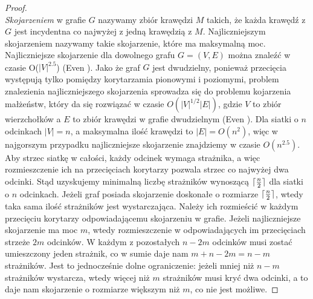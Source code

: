 \documentclass[brudnopis]{xmgr}
\DeclarePairedDelimiter\ceil{\lceil}{\rceil}
\theoremstyle{definition}
\begin{document}
\begin{proof}
 \\ \emph{Skojarzeniem} w grafie $G$ nazywamy zbiór krawędzi $M$ takich, że każda krawędź z $G$ jest incydentna co najwyżej z jedną krawędzią z $M$. Najliczniejszym skojarzeniem nazywamy takie skojarzenie, które ma maksymalną moc. Najliczniejsze skojarzenie dla dowolnego grafu $G = (V,E)$ można znaleźć w czasie O($|V|^{2.5}$) (Even \cite{even}). Jako że graf $G$ jest dwudzielny, ponieważ przecięcia występują tylko pomiędzy korytarzamia pionowymi i poziomymi, problem znalezienia najliczniejszego skojarzenia sprowadza się do problemu kojarzenia małżeństw, który da się rozwiązać w czasie $O(|V|^{1/2}|E|)$, gdzie $V$ to zbiór wierzchołków a $E$ to zbiór krawędzi w grafie dwudzielnym (Even \cite{even}). Dla siatki o $n$ odcinkach $|V| = n$, a maksymalna ilość krawędzi to $|E| = O(n^2)$, więc w najgorszym przypadku najliczniejsze skojarzenie znajdziemy w czasie $O(n^{2.5})$.
 \\\indent Aby strzec siatkę w całości, każdy odcinek wymaga strażnika, a więc rozmieszczenie ich na przecięciach korytarzy pozwala strzec co najwyżej dwa odcinki. Stąd uzyskujemy minimalną liczbę strażników wynoszącą $\ceil{\frac{n}{2}}$ dla siatki o $n$ odcinkach. Jeżeli graf posiada skojarzenie doskonałe o rozmiarze $\ceil{\frac{n}{2}}$, wtedy taka sama ilość strażników jest wystarczająca. Należy ich rozmieścić w każdym przecięciu korytarzy odpowiadającemu skojarzeniu w grafie. Jeżeli najliczniejsze skojarzenie ma moc $m$, wtedy rozmieszczenie w odpowiadających im przecięciach strzeże $2m$ odcinków. W każdym z pozostałych $n - 2m$ odcinków musi zostać umieszczony jeden strażnik, co w sumie daje nam $m + n - 2m = n - m$ strażników. Jest to jednocześnie dolne ograniczenie: jeżeli mniej niż $n - m$ strażników wystarcza, wtedy więcej niż $m$ strażników musi kryć dwa odcinki, a to daje nam skojarzenie o rozmiarze większym niż $m$, co nie jest możliwe.
\end{proof}
\end{document}
